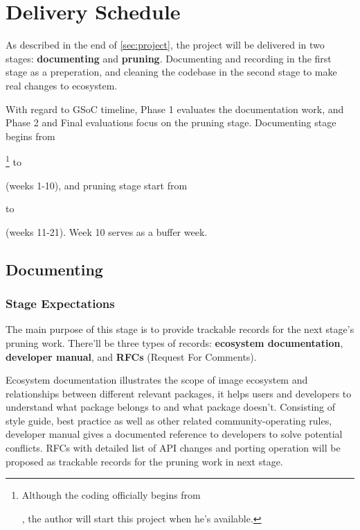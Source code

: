 
\section{Delivery Schedule}\label{sec:delivery}

As described in the end of \cref{sec:project}, the project will be delivered in two stages: \textbf{documenting} and \textbf{pruning}. Documenting and recording in the first stage as a preperation, and cleaning the codebase in the second stage to make real changes to \images{} ecosystem.

With regard to GSoC timeline, \textsf{Phase 1} evaluates the documentation work, and \textsf{Phase 2} and \textsf{Final} evaluations focus on the pruning stage. Documenting stage begins from \date{April 22}\footnote{Although the coding officially begins from \date{May 27}, the author will start this project when he's available.} to \date{June 24} (weeks 1-10), and pruning stage start from \date{July 1} to \date{August 26} (weeks 11-21). Week 10 serves as a buffer week.

\subsection{Documenting}\label{subsec:documentation}

\subsubsection*{Stage Expectations}

The main purpose of this stage is to provide trackable records for the next stage's pruning work. There'll be three types of records: \textbf{ecosystem documentation}, \textbf{developer manual}, and \textbf{RFCs} (Request For Comments). \par

Ecosystem documentation illustrates the scope of image ecosystem and relationships between different relevant packages, it helps users and developers to understand what package belongs to \images{} and what package doesn't. Consisting of style guide, best practice as well as other related community-operating rules, developer manual gives a documented reference to developers to solve potential conflicts. RFCs with detailed list of API changes and porting operation will be proposed as trackable records for the pruning work in next stage. \par

